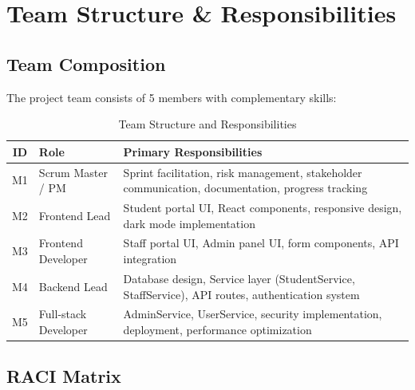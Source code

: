 \documentclass[12pt,a4paper]{article}
\begin{document}
\section{Team Structure \& Responsibilities}

\subsection{Team Composition}

The project team consists of 5 members with complementary skills:

\begin{table}[H]
\centering
\begin{tabularx}{\textwidth}{|c|l|X|}
\hline
\textbf{ID} & \textbf{Role} & \textbf{Primary Responsibilities} \\
\hline
M1 & Scrum Master / PM & Sprint facilitation, risk management, stakeholder communication, documentation, progress tracking \\
\hline
M2 & Frontend Lead & Student portal UI, React components, responsive design, dark mode implementation \\
\hline
M3 & Frontend Developer & Staff portal UI, Admin panel UI, form components, API integration \\
\hline
M4 & Backend Lead & Database design, Service layer (StudentService, StaffService), API routes, authentication system \\
\hline
M5 & Full-stack Developer & AdminService, UserService, security implementation, deployment, performance optimization \\
\hline
\end{tabularx}
\caption{Team Structure and Responsibilities}
\end{table}

\subsection{RACI Matrix}
\end{document}
